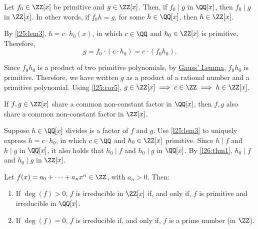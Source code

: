 
\begin{thm}\label{l26:thm1}
	Let $f_0 \in \ZZ[x]$ be primitive and $g \in \ZZ[x]$. Then, if $f_0 \mid g$ in $\QQ[x]$, then $f_0 \mid g$ in $\ZZ[x]$.
	In other words, if $f_0h = g$, for some $h \in \QQ[x]$, then $h \in \ZZ[x]$.
\end{thm}

\begin{dem}
	By \cref{l25:lem3}, $h = c \cdot h_0(x)$, in which $c \in \QQ$ and $h_0 \in \ZZ[x]$ is primitive. Therefore, \[g = f_0\cdot(c\cdot h_0) = c\cdot(f_0h_0).\]

	Since $f_0h_0$ is a product of two primitive polynomials, by \hyperref[l25:gauss]{Gauss' Lemma}, $f_0h_0$ is primitive. Therefore, we have written $g$ as a product of a rational number and a primitive polynomial. Using \cref{l25:cor5}, $g \in \ZZ[x] \implies c \in \ZZ \implies h \in \ZZ[x]$.
\end{dem}

\begin{thm}\label{l26:thm2}
	If $f, g \in \ZZ[x]$ share a common non-constant factor in $\QQ[x]$, then  $f, g$ also share a common non-constant factor in $\ZZ[x]$.
\end{thm}

\begin{dem}
	Suppose $h \in \QQ[x]$ divides is a factor of $f$ and $g$. Use \cref{l25:lem3} to uniquely express $h = c \cdot h_0$, in which $c \in \QQ$ and $h_0 \in \ZZ[x]$ primitive. Since $h \mid f$ and $h \mid g$ in $\QQ[x]$, it also holds that $h_0 \mid f$ and $h_0 \mid g$ in $\QQ[x]$. By \ref{l26:thm1}, $h_0 \mid f$ and $h_0 \mid g$ in $\ZZ[x]$.
\end{dem}

\begin{thm}
	Let $f(x) = a_0 + \cdots + a_nx^n \in \ZZ$, with $a_n > 0$. Then:
	\begin{enumerate}
		\item If $\deg(f) > 0$, $f$ is irreducible in $\ZZ[x]$ if, and only if,  $f$ is primitive and irreducible in $\QQ[x]$.
		\item If $\deg(f) = 0$, $f$ is irreducible if, and only if, $f$ is a prime number (in $\ZZ$).
	\end{enumerate}
\end{thm}

